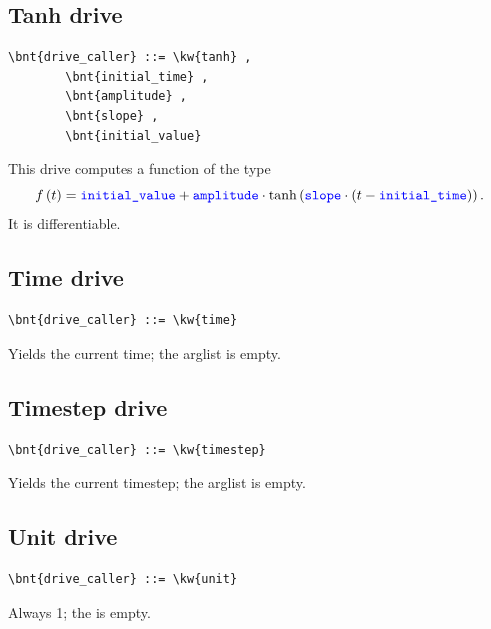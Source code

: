 \subsection{Tanh drive}
\begin{Verbatim}[commandchars=\\\{\}]
    \bnt{drive_caller} ::= \kw{tanh} ,
        \bnt{initial_time} ,
        \bnt{amplitude} ,
        \bnt{slope} ,
        \bnt{initial_value}
\end{Verbatim}
This drive computes a function of the type
\begin{displaymath}
	f\left( t \right) = \textcolor{blue}{\texttt{initial\_value}} + \textcolor{blue}{\texttt{amplitude}} \cdot\mathrm{tanh}\left( 
			\textcolor{blue}{\texttt{slope}} \cdot \left( 
				t - \textcolor{blue}{\texttt{initial\_time}}
			 \right)
		 \right) .
\end{displaymath}
It is differentiable.


\subsection{Time drive}
\begin{Verbatim}[commandchars=\\\{\}]
    \bnt{drive_caller} ::= \kw{time}
\end{Verbatim}
Yields the current time; the arglist is empty.

\subsection{Timestep drive}
\begin{Verbatim}[commandchars=\\\{\}]
    \bnt{drive_caller} ::= \kw{timestep}
\end{Verbatim}
Yields the current timestep; the arglist is empty.

\subsection{Unit drive}
\begin{Verbatim}[commandchars=\\\{\}]
    \bnt{drive_caller} ::= \kw{unit}
\end{Verbatim}
Always 1; the  is empty.

